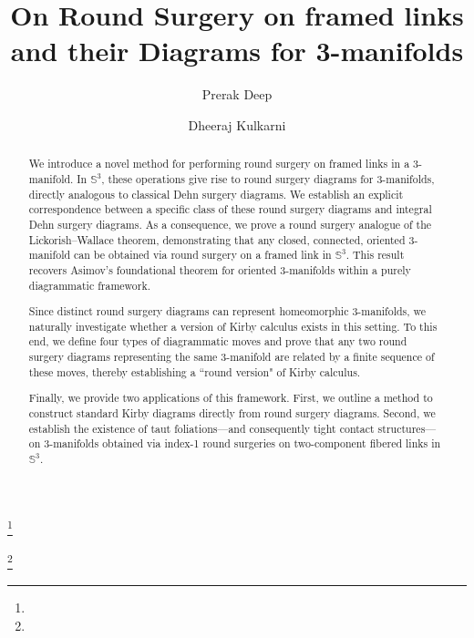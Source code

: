 \documentclass{amsart}
\theoremstyle{plain}
\theoremstyle{remark}
\theoremstyle{definition}
\begin{document}
\title{On Round Surgery on framed links and their Diagrams for 3-manifolds}

\author{Prerak Deep}
\address{Department of Mathematics, Indian Institute of Science Education and Research Bhopal}
\curraddr{}
\thanks{}

\author{Dheeraj Kulkarni}
\address{Department of Mathematics,  Indian Institute of Science Education and Research Bhopal}
\curraddr{}
\thanks{}



\date{}

\dedicatory{}


\begin{abstract}
We introduce a novel method for performing round surgery on framed links in a 3-manifold. In $\mathbb{S}^3$, these operations give rise to round surgery diagrams for 3-manifolds, directly analogous to classical Dehn surgery diagrams. We establish an explicit correspondence between a specific class of these round surgery diagrams and integral Dehn surgery diagrams. As a consequence, we prove a round surgery analogue of the Lickorish--Wallace theorem, demonstrating that any closed, connected, oriented 3-manifold can be obtained via round surgery on a framed link in $\mathbb{S}^3$. This result recovers Asimov's foundational theorem for oriented 3-manifolds within a purely diagrammatic framework. 
   
Since distinct round surgery diagrams can represent homeomorphic 3-manifolds, we naturally investigate whether a version of Kirby calculus exists in this setting. To this end, we define four types of diagrammatic moves and prove that any two round surgery diagrams representing the same 3-manifold are related by a finite sequence of these moves, thereby establishing a ``round version" of Kirby calculus. 

Finally, we provide two applications of this framework. First, we outline a method to construct standard Kirby diagrams directly from round surgery diagrams. Second, we establish the existence of taut foliations—and consequently tight contact structures—on 3-manifolds obtained via index-1 round surgeries on two-component fibered links in $\mathbb{S}^3$.

\end{abstract}
\end{document}
